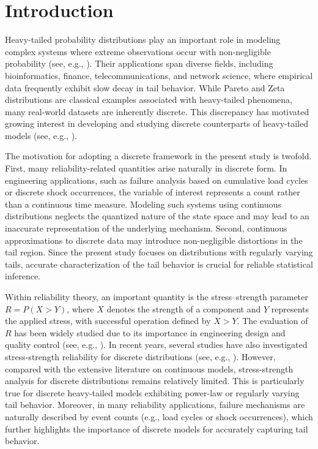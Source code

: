 \documentclass[twoside]{article}
\begin{document}
  
\section{Introduction}
Heavy-tailed probability distributions play an important role in modeling complex systems where extreme observations occur with non-negligible probability (see, e.g., \cite{Foss:2013, Kuznetsov:2017}).   Their applications span diverse fields, including bioinformatics, finance, telecommunications, and network science, where empirical data frequently exhibit slow decay in tail behavior. While Pareto and Zeta distributions are classical examples associated with heavy-tailed phenomena, many real-world datasets are inherently discrete. This discrepancy has motivated growing interest in developing and studying discrete counterparts of heavy-tailed models (see, e.g., \cite{Kuznetsov:2017, Kuznetsov:2022}).

The motivation for adopting a discrete framework in the present study is twofold. First, many reliability-related quantities arise naturally in discrete form. In engineering applications, such as failure analysis based on cumulative load cycles or discrete shock occurrences, the variable of interest represents a count rather than a continuous time measure. Modeling such systems using continuous distributions neglects the quantized nature of the state space and may lead to an inaccurate representation of the underlying mechanism. Second, continuous approximations to discrete data may introduce non-negligible distortions in the tail region. Since the present study focuses on distributions with regularly varying tails, accurate characterization of the tail behavior is crucial for reliable statistical inference.

Within reliability theory, an important quantity is the stress–strength parameter $R=P(X>Y)$, where $X$ denotes the strength of a component and $Y$  represents the applied stress, with successful operation defined by $X>Y$. The evaluation of $R$  has been widely studied due to its importance in engineering design and quality control (see, e.g., \cite{Kotz:2003, Kundu:2010}). In recent years, several studies have also investigated stress-strength reliability for discrete distributions (see, e.g., \cite{Bhattacharya:2025a, Bhattacharya:2025b, Choudhury:2021, Imani:2019}). However, compared with the extensive literature on continuous models, stress-strength analysis for discrete distributions remains relatively limited. This is particularly true for discrete heavy-tailed models exhibiting power-law or regularly varying tail behavior. Moreover, in many reliability applications, failure mechanisms are naturally described by event counts (e.g., load cycles or shock occurrences), which further highlights the importance of discrete models for accurately capturing tail behavior.
\end{document}
